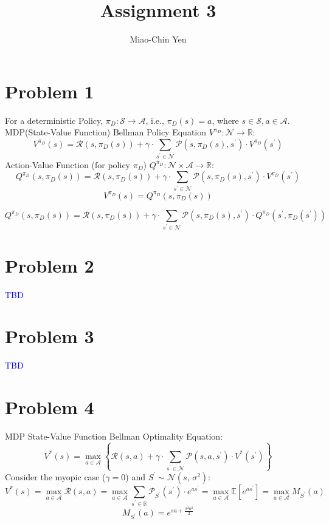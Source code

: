 \documentclass{article}
\title{Assignment 3}
\author{Miao-Chin Yen}
\begin{document}
\maketitle

\section*{Problem 1}
\hspace{1em}For a deterministic Policy, $\pi_{D}: \mathcal{S}\rightarrow \mathcal{A}$, i.e., $\pi_{D}(s) = a$, where $s\in \mathcal{S}, a\in\mathcal{A}$.\\
MDP(State-Value Function) Bellman Policy Equation $V^{\pi_{D}}: \mathcal{N} \rightarrow \mathbb{R}$:
$$
V^{\pi_{D}}(s)=\mathcal{R}(s, \pi_{D}(s))+\gamma \cdot \sum_{s^{\prime} \in \mathcal{N}} \mathcal{P}\left(s,\pi_{D}(s) , s^{\prime}\right) \cdot V^{\pi_{D}}\left(s^{\prime}\right)
$$
Action-Value Function (for policy $\pi_{D}$) $Q^{\pi_{D}}: \mathcal{N} \times \mathcal{A} \rightarrow \mathbb{R}$:
$$Q^{\pi_{D}}(s, \pi_{D}(s))=\mathcal{R}(s, \pi_{D}(s))+\gamma \cdot \sum_{s^{\prime} \in \mathcal{N}} \mathcal{P}\left(s,\pi_{D}(s) , s^{\prime}\right) \cdot V^{\pi_{D}}\left(s^{\prime}\right)
$$
$$
V^{\pi_{D}}(s)=Q^{\pi_{D}}(s, \pi_{D}(s))
$$

$$
Q^{\pi_{D}}(s, \pi_{D}(s))=\mathcal{R}(s, \pi_{D}(s))+\gamma \cdot \sum_{s^{\prime} \in \mathcal{N}} \mathcal{P}\left(s, \pi_{D}(s), s^{\prime}\right)   \cdot Q^{\pi_{D}}\left(s^{\prime}, \pi_{D}(s^{\prime})\right)
$$

\section*{Problem 2}

\textcolor{blue}{TBD}

\section*{Problem 3}
\textcolor{blue}{TBD}

\section*{Problem 4}
MDP State-Value Function Bellman Optimality Equation:
$$
V^{*}(s)=\max _{a \in \mathcal{A}}\left\{\mathcal{R}(s, a)+\gamma \cdot \sum_{s^{\prime} \in \mathcal{N}} \mathcal{P}\left(s, a, s^{\prime}\right) \cdot V^{*}\left(s^{\prime}\right)\right\}
$$
Consider the myopic case ($\gamma = 0$) and $S^{\prime}\sim \mathcal{N}(s,\,\sigma^{2})$:
$$
V^{*}(s)=\max _{a \in \mathcal{A}}\mathcal{R}(s, a) = \max _{a \in \mathcal{A}}\sum_{s^{\prime} \in \mathbb{R}} \mathcal{P}_{S^{\prime}}\left( s^{\prime}\right)\cdot e ^{as^{\prime}} = \max _{a \in \mathcal{A}}\mathbb{E}[e^{as^{\prime}}] = \max _{a \in \mathcal{A}} M_{S^{\prime}}(a)
$$
$$
 M_{S^{\prime}}(a)=e^{sa+\frac{\sigma^2 a^2}{2}}
$$
\end{document}
